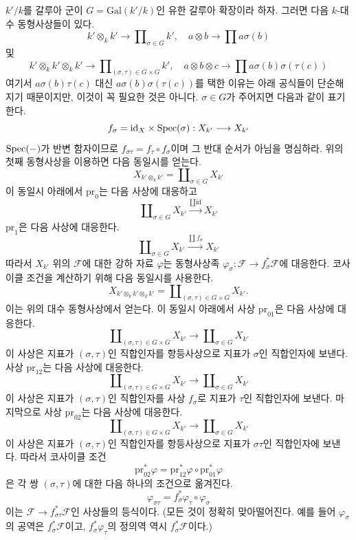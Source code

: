 \medskip\noindent
$k'/k$를 갈루아 군이 $G = \text{Gal}(k'/k)$인 유한 갈루아 확장이라 하자.
그러면 다음 $k$-대수 동형사상들이 있다.
$$
k' \otimes_k k' \longrightarrow \prod\nolimits_{\sigma \in G} k',\quad
a \otimes b \longrightarrow \prod a\sigma(b)
$$
및
$$
k' \otimes_k k' \otimes_k k' \longrightarrow
\prod\nolimits_{(\sigma, \tau) \in G \times G} k',\quad
a \otimes b \otimes c \longrightarrow \prod a\sigma(b)\sigma(\tau(c))
$$
여기서 $a\sigma(b)\tau(c)$ 대신 $a\sigma(b)\sigma(\tau(c))$를 택한 이유는
아래 공식들이 단순해지기 때문이지만, 이것이 꼭 필요한 것은 아니다.
$\sigma \in G$가 주어지면 다음과 같이 표기한다.
$$
f_\sigma = \text{id}_X \times \mathop{\mathrm{Spec}}(\sigma) :
X_{k'} \longrightarrow X_{k'}
$$
$\mathop{\mathrm{Spec}}(-)$가 반변 함자이므로
$f_{\sigma \tau} = f_\tau \circ f_\sigma$이며 그 반대 순서가 아님을
명심하라. 위의 첫째 동형사상을 이용하면 다음 동일시를 얻는다.
$$
X_{k' \otimes_k k'} = \coprod\nolimits_{\sigma \in G} X_{k'}
$$
이 동일시 아래에서 $\text{pr}_0$는 다음 사상에 대응하고
$$
\coprod\nolimits_{\sigma \in G} X_{k'}
\xrightarrow{\coprod \text{id}}
X_{k'}
$$
$\text{pr}_1$은 다음 사상에 대응한다.
$$
\coprod\nolimits_{\sigma \in G} X_{k'}
\xrightarrow{\coprod f_\sigma}
X_{k'}
$$
따라서 $X_{k'}$ 위의 $\mathcal{F}$에 대한 강하 자료 $\varphi$는 동형사상족
$\varphi_\sigma : \mathcal{F} \to f_\sigma^*\mathcal{F}$에 대응한다.
코사이클 조건을 계산하기 위해 다음 동일시를 사용한다.
$$
X_{k' \otimes_k k' \otimes_k k'} =
\coprod\nolimits_{(\sigma, \tau) \in G \times G} X_{k'}.
$$
이는 위의 대수 동형사상에서 얻는다. 이 동일시 아래에서 사상
$\text{pr}_{01}$은 다음 사상에 대응한다.
$$
\coprod\nolimits_{(\sigma, \tau) \in G \times G} X_{k'}
\longrightarrow
\coprod\nolimits_{\sigma \in G} X_{k'}
$$
이 사상은 지표가 $(\sigma, \tau)$인 직합인자를 항등사상으로 지표가
$\sigma$인 직합인자에 보낸다. 사상 $\text{pr}_{12}$는 다음 사상에
대응한다.
$$
\coprod\nolimits_{(\sigma, \tau) \in G \times G} X_{k'}
\longrightarrow
\coprod\nolimits_{\sigma \in G} X_{k'}
$$
이 사상은 지표가 $(\sigma, \tau)$인 직합인자를 사상 $f_\sigma$로 지표가
$\tau$인 직합인자에 보낸다. 마지막으로 사상 $\text{pr}_{02}$는 다음
사상에 대응한다.
$$
\coprod\nolimits_{(\sigma, \tau) \in G \times G} X_{k'}
\longrightarrow
\coprod\nolimits_{\sigma \in G} X_{k'}
$$
이 사상은 지표가 $(\sigma, \tau)$인 직합인자를 항등사상으로 지표가
$\sigma\tau$인 직합인자에 보낸다. 따라서 코사이클 조건
$$
\text{pr}_{02}^*\varphi = \text{pr}_{12}^*\varphi \circ \text{pr}_{01}^*\varphi
$$
은 각 쌍 $(\sigma, \tau)$에 대한 다음 하나의 조건으로 옮겨진다.
$$
\varphi_{\sigma\tau} = f_\sigma^*\varphi_\tau \circ \varphi_\sigma
$$
이는 $\mathcal{F} \to f_{\sigma\tau}^*\mathcal{F}$인 사상들의 등식이다.
(모든 것이 정확히 맞아떨어진다. 예를 들어 $\varphi_\sigma$의 공역은
$f_\sigma^*\mathcal{F}$이고, $f_\sigma^*\varphi_\tau$의 정의역 역시
$f_\sigma^*\mathcal{F}$이다.)

